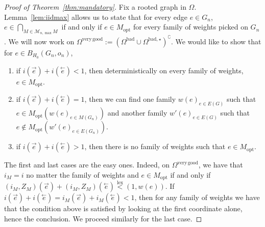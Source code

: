 \documentclass[11pt]{article}
\DeclareMathOperator{\lex}{lex}
\begin{document}
\begin{proof}[Proof of Theorem~\ref{thm:mandatory}]
    Fix a rooted graph in $\Omega$. Lemma~\ref{lem:iidmax} allows us to state that for every edge $e \in G_n$, $ e \in \bigcap_{M \in \mathcal{M}_{n,\max}M}$ if and only if $e \in M_{\mathrm{opt}}$ for every family of weights picked on $G_n$.
    We will now work on $ \Omega^{\mathrm{very\,good}}:= (\Omega^{\mathrm{bad}}\cup \Omega^{\mathrm{bad},\star})^{\complement}$. We would like to show that for $e \in B_{H_0}(G_n,o_n)$,
    \begin{enumerate}
        \item if $i(\overset{\rightarrow}{e})+i(\overset{\leftarrow}{e})<1$, then deterministically on every family of weights, $e \in M_{\mathrm{opt}}$.
        \item if $i(\overset{\rightarrow}{e})+i(\overset{\leftarrow}{e})=1$, then we can find one family $w(e)_{e \in E(G)}$ such that $e \in M_{\mathrm{opt}}(w(e)_{e \in M(G_n)})$ and another family $w'(e)_{e \in E(G)}$ such that $e \notin M_{\mathrm{opt}}(w'(e)_{e \in E(G_n)})$.
        \item if $i(\overset{\rightarrow}{e})+i(\overset{\leftarrow}{e})>1$, then there is no family of weights such that $e \in M_{\mathrm{opt}}$.
    \end{enumerate}
     The first and last cases are the easy ones. Indeed, on $\Omega^{\mathrm{very\,good}}$, we have that $i_M=i$ no matter the family of weights and $e \in M_{\mathrm{opt}}$ if and only if $(i_M,Z_M)(\overset{\rightarrow}{e})+(i_M,Z_M)(\overset{\leftarrow}{e})\overset{\lex}{<}(1,w(e))$.
     If $i(\overset{\rightarrow}{e})+i(\overset{\leftarrow}{e})=i_M(\overset{\rightarrow}{e})+i_M(\overset{\leftarrow}{e})<1$, then for any family of weights we have that the condition above is satisfied by looking at the first coordinate alone, hence the conclusion. We proceed similarly for the last case.


\end{proof}
\end{document}
